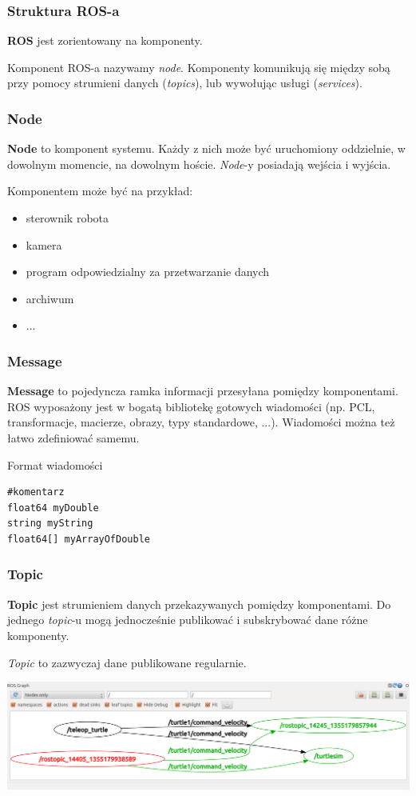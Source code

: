\documentclass[12pt,a4paper,portrait]{beamer}
\begin{document}
\begin{frame}
\frametitle{Struktura ROS-a}
\textbf{ROS} jest zorientowany na komponenty.
\vspace{1cm}

Komponent ROS-a nazywamy \textit{node}. Komponenty komunikują się między sobą przy pomocy strumieni danych (\textit{topics}), lub wywołując usługi (\textit{services}).
\end{frame}


\begin{frame}
\frametitle{Node}
\textbf{Node} to komponent systemu. Każdy z nich może być uruchomiony oddzielnie, w dowolnym momencie, na dowolnym hoście. \textit{Node}-y posiadają wejścia i wyjścia.

Komponentem może być na przykład:
\begin{itemize}
\item sterownik robota
\item kamera
\item program odpowiedzialny za przetwarzanie danych
\item archiwum
\item ...
\end{itemize}
\end{frame}


\begin{frame}[fragile]
\frametitle{Message}
\textbf{Message} to pojedyncza ramka informacji przesyłana pomiędzy komponentami. ROS wyposażony jest w bogatą bibliotekę gotowych wiadomości (np. PCL, transformacje, macierze, obrazy, typy standardowe, ...). Wiadomości można też łatwo zdefiniować samemu.


\begin{block}{Format wiadomości}
\begin{verbatim}
#komentarz
float64 myDouble
string myString
float64[] myArrayOfDouble
\end{verbatim}
\end{block}
\end{frame}


\begin{frame}
\frametitle{Topic}
\textbf{Topic} jest strumieniem danych przekazywanych pomiędzy komponentami. Do jednego \textit{topic}-u mogą jednocześnie publikować i subskrybować dane różne komponenty.

\textit{Topic} to zazwyczaj dane publikowane regularnie.

\begin{center}
\includegraphics[width=1\textwidth]{pics/topic.png}
\end{center}
\end{frame}
\end{document}
